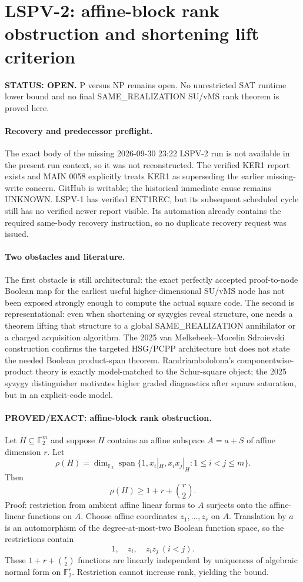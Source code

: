 \documentclass[11pt]{article}
\begin{document}
\section*{LSPV-2: affine-block rank obstruction and shortening lift criterion}
\textbf{STATUS: OPEN.} P versus NP remains open. No unrestricted SAT runtime lower bound and no final SAME\_REALIZATION SU/vMS rank theorem is proved here.

\paragraph{Recovery and predecessor preflight.}
The exact body of the missing 2026-09-30 23:22 LSPV-2 run is not available in the present run context, so it was not reconstructed. The verified KER1 report exists and MAIN 0058 explicitly treats KER1 as superseding the earlier missing-write concern. GitHub is writable; the historical immediate cause remains UNKNOWN. LSPV-1 has verified ENT1REC, but its subsequent scheduled cycle still has no verified newer report visible. Its automation already contains the required same-body recovery instruction, so no duplicate recovery request was issued.

\paragraph{Two obstacles and literature.}
The first obstacle is still architectural: the exact perfectly accepted proof-to-node Boolean map for the earliest useful higher-dimensional SU/vMS node has not been exposed strongly enough to compute the actual square code. The second is representational: even when shortening or syzygies reveal structure, one needs a theorem lifting that structure to a global SAME\_REALIZATION annihilator or a charged acquisition algorithm. The 2025 van Melkebeek--Mocelin Sdroievski construction confirms the targeted HSG/PCPP architecture but does not state the needed Boolean product-span theorem. Randriambololona's componentwise-product theory is exactly model-matched to the Schur-square object; the 2025 syzygy distinguisher motivates higher graded diagnostics after square saturation, but in an explicit-code model.

\paragraph{PROVED/EXACT: affine-block rank obstruction.}
Let $H\subseteq\mathbb F_2^m$ and suppose $H$ contains an affine subspace $A=a+S$ of affine dimension $r$. Let
\[
\rho(H)=\dim_{\mathbb F_2}\operatorname{span}\{1,x_i|_H,x_ix_j|_H:1\le i<j\le m\}.
\]
Then
\[
\boxed{\rho(H)\ge 1+r+\binom r2.}
\]
Proof: restriction from ambient affine linear forms to $A$ surjects onto the affine-linear functions on $A$. Choose affine coordinates $z_1,\ldots,z_r$ on $A$. Translation by $a$ is an automorphism of the degree-at-most-two Boolean function space, so the restrictions contain
\[
1,\quad z_i,\quad z_i z_j\ (i<j).
\]
These $1+r+\binom r2$ functions are linearly independent by uniqueness of algebraic normal form on $\mathbb F_2^r$. Restriction cannot increase rank, yielding the bound.
\end{document}
